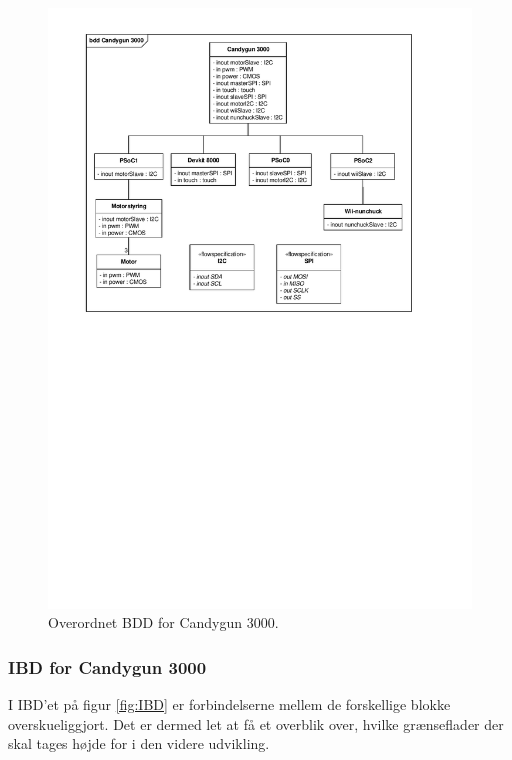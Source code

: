 \begin{figure}[H]
	\centering
	\includegraphics[trim = {1.8cm 14.6cm 1.8cm 1cm}, clip = true, width = \textwidth]{Systemarkitektur/images/BDD_overordnet.pdf}
	\caption{Overordnet BDD for Candygun 3000.}
	\label{fig:BDD}
\end{figure}

\subsubsection{IBD for Candygun 3000}
I IBD'et på figur \ref{fig:IBD} er forbindelserne mellem de forskellige blokke overskueliggjort. Det er dermed let at få et overblik over, hvilke grænseflader der skal tages højde for i den videre udvikling. 

